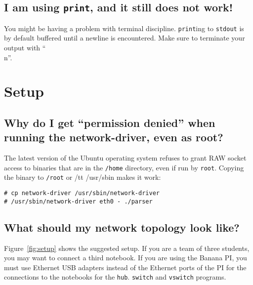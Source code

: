 \documentclass{article}
\begin{document}
\subsection{I am using {\tt print}, and it still does not work!}

You might be having a problem with terminal discipline. {\tt print}ing
to {\tt stdout} is by default buffered until a newline is encountered.
Make sure to terminate your output with ``\\n''.


\newpage
\section{Setup}

\subsection{Why do I get ``permission denied'' when running the network-driver, even as root?}

The latest version of the Ubuntu operating system refuses
to grant RAW socket access to binaries that are in the {\tt /home}
directory, even if run by {\tt root}.  Copying the binary to
{\tt /root} or {/tt /usr/sbin} makes it work:

\begin{verbatim}
# cp network-driver /usr/sbin/network-driver
# /usr/sbin/network-driver eth0 - ./parser
\end{verbatim}

\subsection{What should my network topology look like?}

Figure~\ref{fig:setup} shows the suggested setup.  If you are a team
of three students, you may want to connect a third notebook. If you
are using the Banana PI, you must use Ethernet USB adapters instead of
the Ethernet ports of the PI for the connections to the notebooks for
the {\tt hub}.  {\tt switch} and {\tt vswitch} programs.
\end{document}
